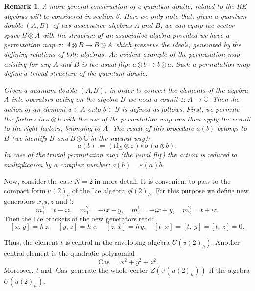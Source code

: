 \documentclass[10pt,a4paper]{amsart}
\newcommand{\ot}{\otimes}
\newcommand{\C}{\mathbb{C}}
\DeclareMathOperator{\Cas}{Cas}
\numberwithin{equation}{section}
\newtheorem{remark}[theorem]{Remark}
\begin{document}
\begin{remark}
\label{rem:1}
A more general construction of a quantum double, related to the RE algebras will be considered in section 6. Here we only note that,
given a quantum double $(A,B)$ of two associative algebras $A$ and $B$, we can equip the vector space $B\otimes A$ with
the structure of an associative algebra provided we have a permutation map $\sigma: \,A\otimes B\rightarrow B\otimes A$ which preserve
the ideals, generated by the defining relations of both algebras. An evident example of the permutation map existing for any $A$ and
$B$ is the usual flip: $a\otimes b\mapsto b\otimes a$. Such a permutation map define a trivial structure of the quantum double.

Given a quantum double $(A, B)$, in order to convert the elements of the algebra $A$ into operators acting on the algebra $B$ we need a counit $ \varepsilon:\,A\to \C$.
Then the action of an element $a\in A$ onto $b\in B$ is defined as follows. First, we permute
the factors in $a\ot b$  with the use of the permutation map and then apply the counit to the right factors, belonging to $A$. The result of
this procedure $a(b)$ belongs to $B$ (we identify $B$ and $B\ot \C$ in the natural way):
\[
a(b) := (\mathrm{id}_B\otimes \varepsilon)\circ\sigma(a\otimes b).
\]
In case of the trivial permutation map (the usual flip) the action is reduced to multiplicaion by a complex number:
$a(b) = \varepsilon(a) b$.
\end{remark}

Now, consider the case $N=2$ in more detail. It is convenient to pass to the compact form $u(2)_h$ of the Lie algebra $gl(2)_h$.
For this purpose we define new generators $x,y,z$ and $t$:
\[
m_1^1=t-iz,\quad m_1^2=-ix-y,\quad m_2^1=-ix+y,\quad m_2^2=t+iz.
\]
Then the Lie brackets of the new generators read:
\[
[x, \, y]= h\, z,\quad [y, \, z]= h\, x,\quad[z, \, x]=h\, y,\quad [t, \, x]=[t, \, y]=[t, \, z]=0.
\]

Thus, the element $t$ is central in the enveloping algebra $U(u(2)_h)$. Another central element is the quadratic polynomial
\[
{{\Cas}} = x^2+y^2+z^2.
\]
Moreover, $t$ and $\Cas$ generate the whole center $Z(U(u(2)_h))$ of the algebra $U(u(2)_h)$.
\end{document}
